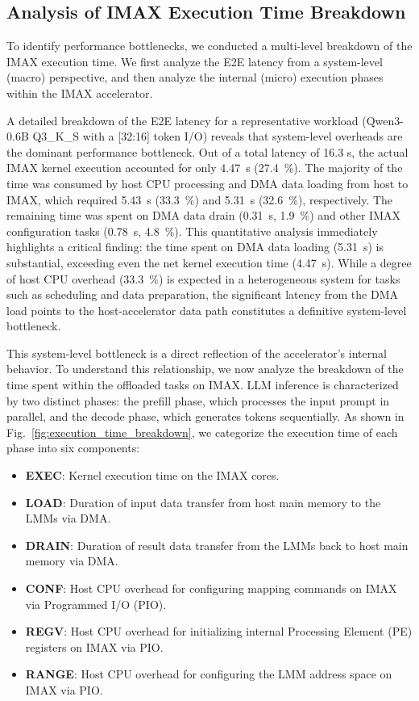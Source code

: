 \subsection{Analysis of IMAX Execution Time Breakdown}


To identify performance bottlenecks, we conducted a multi-level breakdown of the IMAX execution time. 
We first analyze the E2E latency from a system-level (macro) perspective, and then analyze the internal (micro) execution phases within the IMAX accelerator.

A detailed breakdown of the E2E latency for a representative workload (Qwen3-0.6B Q3\_K\_S with a [32:16] token I/O) reveals that system-level overheads are the dominant performance bottleneck. 
Out of a total latency of 16.3 s, the actual IMAX kernel execution accounted for only \SI{4.47}{\second} (\SI{27.4}{\percent}). 
The majority of the time was consumed by host CPU processing and DMA data loading from host to IMAX, which required \SI{5.43}{\second} (\SI{33.3}{\percent}) and \SI{5.31}{\second} (\SI{32.6}{\percent}), respectively. 
The remaining time was spent on DMA data drain (\SI{0.31}{\second}, \SI{1.9}{\percent}) and other IMAX configuration tasks (\SI{0.78}{\second}, \SI{4.8}{\percent}). 
This quantitative analysis immediately highlights a critical finding: the time spent on DMA data loading (\SI{5.31}{\second}) is substantial, exceeding even the net kernel execution time (\SI{4.47}{\second}).
While a degree of host CPU overhead (\SI{33.3}{\percent}) is expected in a heterogeneous system for tasks such as scheduling and data preparation, the significant latency from the DMA load points to the host-accelerator data path constitutes a definitive system-level bottleneck.


This system-level bottleneck is a direct reflection of the accelerator's internal behavior. 
To understand this relationship, we now analyze the breakdown of the time spent within the offloaded tasks on IMAX. 
LLM inference is characterized by two distinct phases: the prefill phase, which processes the input prompt in parallel, and the decode phase, which generates tokens sequentially. 
As shown in Fig.~\ref{fig:execution_time_breakdown}, we categorize the execution time of each phase into six components:
\begin{itemize}
  \item \textbf{EXEC}: Kernel execution time on the IMAX cores.
  \item \textbf{LOAD}: Duration of input data transfer from host main memory to the LMMs via DMA.
  \item \textbf{DRAIN}: Duration of result data transfer from the LMMs back to host main memory via DMA.
  \item \textbf{CONF}:  Host CPU overhead for configuring mapping commands on IMAX via Programmed I/O (PIO).
  \item \textbf{REGV}: Host CPU overhead for initializing internal Processing Element (PE) registers on IMAX via PIO.
  \item \textbf{RANGE}: Host CPU overhead for configuring the LMM address space on IMAX via PIO.
\end{itemize}



